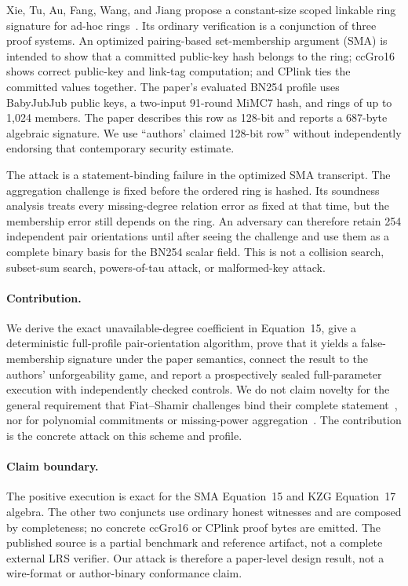 \documentclass[10pt,a4paper]{article}
\begin{document}
Xie, Tu, Au, Fang, Wang, and Jiang propose a constant-size scoped linkable
ring signature for ad-hoc rings~\cite{lrs}. Its ordinary verification is a
conjunction of three proof systems. An optimized pairing-based set-membership
argument (SMA) is intended to show that a committed public-key hash belongs to
the ring; ccGro16 shows correct public-key and link-tag computation; and
CPlink ties the committed values together. The paper's evaluated BN254
profile uses BabyJubJub public keys, a two-input 91-round MiMC7 hash, and rings
of up to 1,024 members. The paper describes this row as 128-bit and reports a
687-byte algebraic signature. We use ``authors' claimed 128-bit row'' without
independently endorsing that contemporary security estimate.

The attack is a statement-binding failure in the optimized SMA transcript.
The aggregation challenge is fixed before the ordered ring is hashed. Its
soundness analysis treats every missing-degree relation error as fixed at
that time, but the membership error still depends on the ring. An adversary
can therefore retain 254 independent pair orientations until after seeing
the challenge and use them as a complete binary basis for the BN254 scalar
field. This is not a collision search, subset-sum search, powers-of-tau
attack, or malformed-key attack.

\paragraph{Contribution.}
We derive the exact unavailable-degree coefficient in Equation~15, give a
deterministic full-profile pair-orientation algorithm, prove that it yields a
false-membership signature under the paper semantics, connect the result to
the authors' unforgeability game, and report a prospectively sealed
full-parameter execution with independently checked controls. We do not
claim novelty for the general requirement that Fiat--Shamir challenges bind
their complete statement~\cite{fiatshamir}, nor for polynomial commitments
or missing-power aggregation~\cite{kzg}. The contribution is the concrete
attack on this scheme and profile.

\paragraph{Claim boundary.}
The positive execution is exact for the SMA Equation~15 and KZG Equation~17
algebra. The other two conjuncts use ordinary honest witnesses and are
composed by completeness; no concrete ccGro16 or CPlink proof bytes are
emitted. The published source is a partial benchmark and reference artifact,
not a complete external LRS verifier. Our attack is therefore a paper-level
design result, not a wire-format or author-binary conformance claim.
\end{document}
